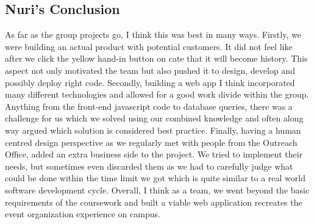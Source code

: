 \documentclass[10pt,a4paper]{article}
\begin{document}
 \subsection{Nuri's Conclusion}
 As far as the group projects go, I think this was best in many ways. Firstly, 
we were building an actual product with potential customers. It did not feel 
like after we click the yellow hand-in button on cate that it will become 
history. This aspect not only motivated the team but also pushed it to design, 
develop and possibly deploy right code. Secondly, building a web app I think 
incorporated many different technologies and allowed for a good work divide 
within the group. Anything from the front-end javascript code to database 
queries, there was a challenge for us which we solved using our combined 
knowledge and often along way argued which solution is considered best practice. 
Finally, having a human centred design perspective as we regularly met with 
people from the Outreach Office, added an extra business side to the project. We 
tried to implement their needs, but sometimes even discarded them as we had to 
carefully judge what could be done within the time limit we got which is quite 
similar to a real world software development cycle. Overall, I think as a team, 
we went beyond the basic requirements of the coursework and built a viable web 
application recreates the event organization experience on campus.

\appendix
\label{appendix}
\end{document}
